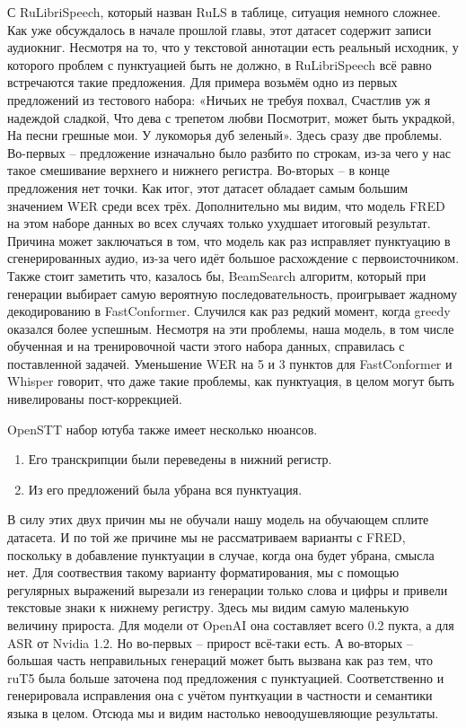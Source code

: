 С RuLibriSpeech, который назван RuLS в таблице, ситуация немного сложнее.
Как уже обсуждалось в начале прошлой главы, этот датасет содержит записи аудиокниг.
Несмотря на то, что у текстовой аннотации есть реальный исходник, у которого проблем с пунктуацией быть не должно, в RuLibriSpeech всё равно встречаются такие предложения.
Для примера возьмём одно из первых предложений из тестового набора:
«Ничьих не требуя похвал, Счастлив уж я надеждой сладкой, Что дева с трепетом любви Посмотрит, может быть украдкой, На песни грешные мои. У лукоморья дуб зеленый».
Здесь сразу две проблемы.
Во-первых -- предложение изначально было разбито по строкам, из-за чего у нас такое смешивание верхнего и нижнего регистра.
Во-вторых -- в конце предложения нет точки.
Как итог, этот датасет обладает самым большим значением WER среди всех трёх.
Дополнительно мы видим, что модель FRED на этом наборе данных во всех случаях только ухудшает итоговый результат.
Причина может заключаться в том, что модель как раз исправляет пунктуацию в сгенерированных аудио, из-за чего идёт большое расхождение с первоисточником.
Также стоит заметить что, казалось бы, BeamSearch алгоритм, который при генерации выбирает самую вероятную последовательность, проигрывает жадному декодированию в FastConformer.
Случился как раз редкий момент, когда greedy оказался более успешным.
Несмотря на эти проблемы, наша модель, в том числе обученная и на тренировочной части этого набора данных, справилась с поставленной задачей.
Уменьшение WER на 5 и 3 пунктов для FastConformer и Whisper говорит, что даже такие проблемы, как пунктуация, в целом могут быть нивелированы пост-коррекцией.

OpenSTT набор ютуба также имеет несколько нюансов.
\begin{enumerate}
  \item Его транскрипции были переведены в нижний регистр.
  \item Из его предложений была убрана вся пунктуация.
\end{enumerate}

В силу этих двух причин мы не обучали нашу модель на обучающем сплите датасета.
И по той же причине мы не рассматриваем варианты с FRED, поскольку в добавление пунктуации в случае, когда она будет убрана, смысла нет.
Для соотвествия такому варианту форматирования, мы с помощью регулярных выражений вырезали из генерации только слова и цифры и привели текстовые знаки к нижнему регистру.
Здесь мы видим самую маленькую величину прироста.
Для модели от OpenAI она составляет всего 0.2 пукта, а для ASR от Nvidia 1.2.
Но во-первых -- прирост всё-таки есть.
А во-вторых -- большая часть неправильных генераций может быть вызвана как раз тем, что ruT5 была больше заточена под предложения с пунктуацией.
Соответственно и генерировала исправления она с учётом пунткуации в частности и семантики языка в целом.
Отсюда мы и видим настолько невоодушевляющие результаты.


